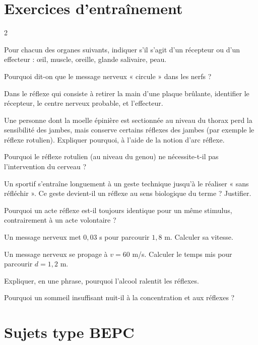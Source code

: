 \section{Exercices d'entraînement}
\begin{multicols}{2}

\exo{} Pour chacun des organes suivants, indiquer s'il s'agit d'un récepteur ou
d'un effecteur : œil, muscle, oreille, glande salivaire, peau.

\exo{} Pourquoi dit-on que le message nerveux « circule » dans les nerfs ?

\exo{} Dans le réflexe qui consiste à retirer la main d'une plaque brûlante,
identifier le récepteur, le centre nerveux probable, et l'effecteur.

\exo{} Une personne dont la moelle épinière est sectionnée au niveau du thorax
perd la sensibilité des jambes, mais conserve certains réflexes des jambes (par exemple le
réflexe rotulien). Expliquer pourquoi, à l'aide de la notion d'arc réflexe.

\exo{} Pourquoi le réflexe rotulien (au niveau du genou) ne nécessite-t-il pas
l'intervention du cerveau ?

\exo{} Un sportif s'entraîne longuement à un geste technique jusqu'à le réaliser
« sans réfléchir ». Ce geste devient-il un réflexe au sens biologique du terme ?
Justifier.

\exo{} Pourquoi un acte réflexe est-il toujours identique pour un même stimulus,
contrairement à un acte volontaire ?

\exo{} Un message nerveux met $0{,}03$ s pour parcourir $1{,}8$ m. Calculer sa
vitesse.

\exo{} Un message nerveux se propage à $v=60$ m/s. Calculer le temps mis pour
parcourir $d=1{,}2$ m.

\exo{} Expliquer, en une phrase, pourquoi l'alcool ralentit les réflexes.

\exo{} Pourquoi un sommeil insuffisant nuit-il à la concentration et aux réflexes ?

\end{multicols}

\section{Sujets type BEPC}

